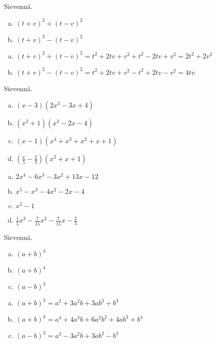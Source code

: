 \begin{tehtava}
    Sievennä.
    \begin{enumerate}[a)]
        \item $(t+v)^2+(t-v)^2$
        \item $(t+v)^2-(t-v)^2$
    \end{enumerate}
    \begin{vastaus}
        \begin{enumerate}[a)]
            \item $(t+v)^2+(t-v)^2 = t^2+2tv+v^2+t^2-2tv+v^2 = 2t^2+2v^2$
            \item $(t+v)^2-(t-v)^2 = t^2+2tv+v^2-t^2+2tv-v^2 = 4tv$
        \end{enumerate}
    \end{vastaus}
\end{tehtava}

\begin{tehtava}
	Sievennä. 
	\begin{enumerate}[a)]
		\item $(x-3)(2x^3-3x+4)$
		\item $(x^2+1)(x^3-2x-4)$
		\item $(x-1)(x^4+x^3+x^2+x+1)$
		\item $(\frac x5-\frac23)(x^2+x+1)$
	\end{enumerate}
	\begin{vastaus}
		\begin{enumerate}[a)]
			\item $2x^4-6x^3-3x^2+13x-12$
			\item $x^5-x^3-4x^2-2x-4$
			\item $x^5-1$
			\item $\frac15x^3-\frac{7}{15}x^2-\frac{7}{15}x-\frac23$
		\end{enumerate}
	\end{vastaus}
\end{tehtava}

\begin{tehtava}
    Sievennä.
    \begin{enumerate}[a)]
            \item $(a+b)^3$
            \item $(a+b)^4$
            \item $(a-b)^3$
        \end{enumerate}
    \begin{vastaus}
        \begin{enumerate}[a)]
            \item $(a+b)^3 = a^3 + 3a^2b + 3ab^2 + b^3$
            \item $(a+b)^4 = a^4 + 4a^3b + 6a^2b^2 + 4ab^3 + b^4$
            \item $(a-b)^3 = a^3 - 3a^2b + 3ab^2 - b^3$
        \end{enumerate}
    \end{vastaus}
\end{tehtava}

